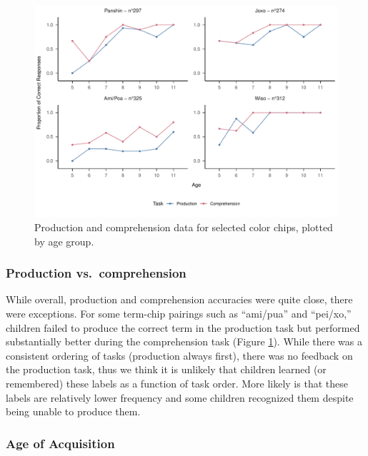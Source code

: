 \documentclass[
  ,apa7,floatsintext]{apa6}
\begin{document}
\begin{figure}
\centering
\includegraphics{amazon_color_files/figure-latex/study2-task-compare-plot-1.pdf}
\caption{\label{fig:study2-task-compare-plot}Production and comprehension data for selected color chips, plotted by age group.}
\end{figure}

\hypertarget{production-vs.-comprehension}{%
\subsubsection{Production vs.~comprehension}\label{production-vs.-comprehension}}

While overall, production and comprehension accuracies were quite close, there were exceptions. For some term-chip pairings such as ``ami/pua'' and ``pei/xo,'' children failed to produce the correct term in the production task but performed substantially better during the comprehension task (Figure \ref{fig:study2-task-compare-plot}). While there was a consistent ordering of tasks (production always first), there was no feedback on the production task, thus we think it is unlikely that children learned (or remembered) these labels as a function of task order. More likely is that these labels are relatively lower frequency and some children recognized them despite being unable to produce them.

\hypertarget{age-of-acquisition}{%
\subsubsection{Age of Acquisition}\label{age-of-acquisition}}
\end{document}
